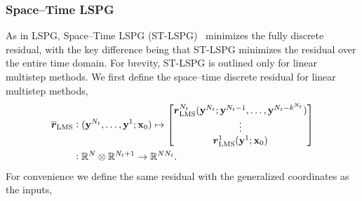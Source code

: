 \documentclass[3p,computermodern,10pt]{elsarticle}
\begin{document}
\subsubsection{Space--Time LSPG} 
As in LSPG, Space--Time LSPG (ST-LSPG)~\cite{choi_stlspg} minimizes the fully discrete residual, with the key difference being that ST-LSPG minimizes the residual over the entire time domain. For brevity, ST-LSPG is outlined only for linear multistep methods.
We first define the space--time discrete residual for linear multistep methods,
\begin{align*}
\overline{\boldsymbol r}_{\text{LMS}} & \vcentcolon (\mathbf{y}^{N_t}, \ldots ,\mathbf{y}^{1};{{\mathbf{x}}_0}) \mapsto \begin{bmatrix}
\boldsymbol r_{\text{LMS}}^{N_t}(\mathbf{y}^{N_t};\mathbf{y}^{N_t-1},\ldots,\mathbf{y}^{N_t - k^{N_t}}) \\ 
\vdots \\
\boldsymbol r_{\text{LMS}}^{1}(\mathbf{y}^{1}; {{\mathbf{x}}_0}) 
\end{bmatrix}  \\
& \vcentcolon \mathbb{R}^{N} \otimes \mathbb{R}^{N_t+1} \rightarrow \mathbb{R}^{N N_t}. 
\end{align*}
For convenience we define the same residual with the generalized coordinates as the inputs,
\end{document}
